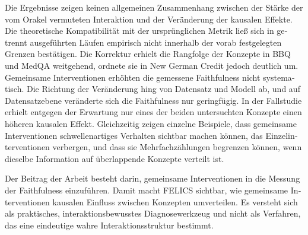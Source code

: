 \begin{otherlanguage}{ngerman}
	Die Ergebnisse zeigen keinen allgemeinen Zusammenhang zwischen der Stärke der
	vom Orakel vermuteten Interaktion und der Veränderung der kausalen Effekte.
	Die theoretische Kompatibilität mit der ursprünglichen Metrik ließ sich in
	getrennt ausgeführten Läufen empirisch nicht innerhalb der vorab festgelegten
	Grenzen bestätigen. Die Korrektur erhielt die Rangfolge der Konzepte in BBQ und
	MedQA weitgehend, ordnete sie in New German Credit jedoch deutlich um.
	Gemeinsame Interventionen erhöhten die gemessene Faithfulness nicht systematisch. Die
	Richtung der Veränderung hing von Datensatz und Modell ab, und auf
	Datensatzebene veränderte sich die Faithfulness nur geringfügig. In der Fallstudie
	erhielt entgegen der Erwartung nur eines der beiden untersuchten Konzepte einen höheren kausalen
	Effekt. Gleichzeitig zeigen einzelne Beispiele, dass gemeinsame Interventionen
	schwellenartiges Verhalten sichtbar machen können, das Einzelinterventionen
	verbergen, und dass sie Mehrfachzählungen begrenzen können, wenn dieselbe
	Information auf überlappende Konzepte verteilt ist.

	Der Beitrag der Arbeit besteht darin, gemeinsame Interventionen in die Messung
	der Faithfulness einzuführen. Damit macht FELICS sichtbar, wie
	gemeinsame Interventionen kausalen Einfluss zwischen Konzepten umverteilen. Es
	versteht sich als praktisches, interaktionsbewusstes Diagnosewerkzeug und nicht
	als Verfahren, das eine eindeutige wahre Interaktionsstruktur bestimmt.

	\endgroup
\end{otherlanguage}
